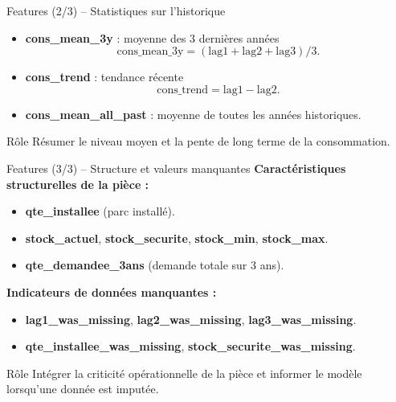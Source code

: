 \documentclass[aspectratio=169]{beamer}
\begin{document}
\begin{frame}{Features (2/3) -- Statistiques sur l'historique}
  \begin{itemize}
    \item \textbf{cons\_mean\_3y} : moyenne des 3 dernières années
      \[
        \text{cons\_mean\_3y} = (\text{lag1} + \text{lag2} + \text{lag3})/3.
      \]
    \item \textbf{cons\_trend} : tendance récente
      \[
        \text{cons\_trend} = \text{lag1} - \text{lag2}.
      \]
    \item \textbf{cons\_mean\_all\_past} : moyenne de toutes les années historiques.
  \end{itemize}
  \vspace{0.5em}
  \begin{block}{Rôle}
    Résumer le niveau moyen et la pente de long terme de la consommation.
  \end{block}
\end{frame}

\begin{frame}{Features (3/3) -- Structure et valeurs manquantes}
  \textbf{Caractéristiques structurelles de la pièce :}
  \begin{itemize}
    \item \textbf{qte\_installee} (parc installé).
    \item \textbf{stock\_actuel}, \textbf{stock\_securite}, \textbf{stock\_min}, \textbf{stock\_max}.
    \item \textbf{qte\_demandee\_3ans} (demande totale sur 3 ans).
  \end{itemize}
  \vspace{0.5em}
  \textbf{Indicateurs de données manquantes :}
  \begin{itemize}
    \item \textbf{lag1\_was\_missing}, \textbf{lag2\_was\_missing}, \textbf{lag3\_was\_missing}.
    \item \textbf{qte\_installee\_was\_missing}, \textbf{stock\_securite\_was\_missing}.
  \end{itemize}
  \begin{block}{Rôle}
    Intégrer la criticité opérationnelle de la pièce et informer le modèle lorsqu'une donnée est imputée.
  \end{block}
\end{frame}
\end{document}
